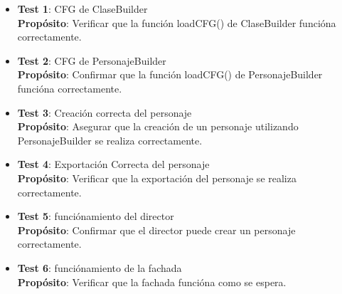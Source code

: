 \documentclass{article}
\begin{document}
\begin{itemize}
	\item \textbf{Test 1}: CFG de ClaseBuilder\\
\textbf{Propósito}: Verificar que la función loadCFG() de ClaseBuilder funcióna correctamente.

	\item \textbf{Test 2}: CFG de PersonajeBuilder
\\ \textbf{Propósito}: Confirmar que la función loadCFG() de PersonajeBuilder funcióna correctamente.


	\item \textbf{Test 3}: Creación correcta del personaje\\
\textbf{Propósito}: Asegurar que la creación de un personaje utilizando PersonajeBuilder se realiza correctamente.


	\item \textbf{Test 4}: Exportación Correcta del personaje
\\\textbf{Propósito}: Verificar que la exportación del personaje se realiza correctamente.


	\item \textbf{Test 5}: funciónamiento del director
\\ \textbf{Propósito}: Confirmar que el director puede crear un personaje correctamente.


	\item \textbf{Test 6}: funciónamiento de la fachada
\\ \textbf{Propósito}: Verificar que la fachada funcióna como se espera.

\end{itemize}
\end{document}
